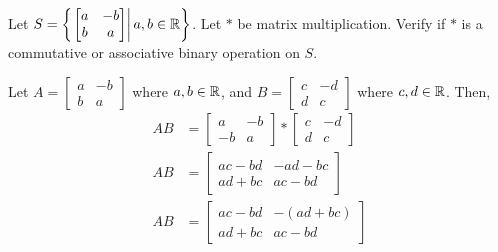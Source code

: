     \begin{example}
        Let \(\displaystyle S = \left\{\left.\begin{bmatrix}
            a & -b \\ b & a
        \end{bmatrix}\right| a,b\in\mathbb{R}\right\}\). Let \(*\) be matrix multiplication. Verify if \(*\) is a commutative or associative binary operation on \(S\).

        Let \(A = \begin{bmatrix} a & -b \\ b & a \end{bmatrix}\) where \(a,b\in\mathbb{R}\), and \(B = \begin{bmatrix} c & -d \\ d & c \end{bmatrix}\) where \(c,d\in\mathbb{R}\). Then,
        \begin{align*}
            AB &= \begin{bmatrix} a & -b \\ -b & a \end{bmatrix} *\begin{bmatrix} c & -d \\ d & c \end{bmatrix} \\
            AB &= \begin{bmatrix}
                ac - bd & -ad - bc \\
                ad + bc & ac - bd
            \end{bmatrix} \\
            AB &= \begin{bmatrix}
                ac - bd & -(ad + bc) \\
                ad + bc & ac - bd
            \end{bmatrix}
        \end{align*}


\end{example}
